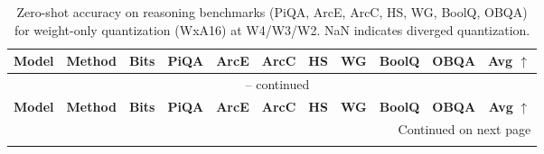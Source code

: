 \documentclass{article} %
\begin{document}

\vspace{-1mm}
\begingroup
\fontsize{7.3pt}{8.6pt}\selectfont
\setlength{\tabcolsep}{6pt}
\begin{longtable}{l||l|c|cccccccr}
\caption{Zero-shot accuracy on reasoning benchmarks (PiQA, ArcE, ArcC, HS, WG, BoolQ, OBQA) for weight-only quantization (WxA16) at W4/W3/W2. NaN indicates diverged quantization.}
\label{tab:weight_only_zs} \\

\hline
\textbf{Model} & \textbf{Method} & \textbf{Bits}
  & \textbf{PiQA} & \textbf{ArcE} & \textbf{ArcC} & \textbf{HS}
  & \textbf{WG} & \textbf{BoolQ} & \textbf{OBQA}
  & \textbf{Avg} $\!\uparrow$ \\
\hline
\endfirsthead

\multicolumn{11}{c}{{\tablename\ \thetable{} -- continued}} \\
\hline
\textbf{Model} & \textbf{Method} & \textbf{Bits}
  & \textbf{PiQA} & \textbf{ArcE} & \textbf{ArcC} & \textbf{HS}
  & \textbf{WG} & \textbf{BoolQ} & \textbf{OBQA}
  & \textbf{Avg} $\!\uparrow$ \\
\hline
\endhead

\multicolumn{11}{r}{{Continued on next page}} \\
\endfoot

\hline
\endlastfoot


\end{longtable}
\end{document}
